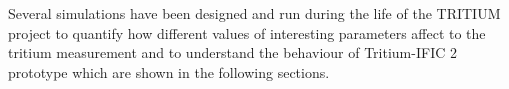 Several simulations have been designed and run during the life of the TRITIUM project to quantify how different values of interesting parameters affect to the tritium measurement and to understand the behaviour of Tritium-IFIC 2 prototype which are shown in the following sections. 